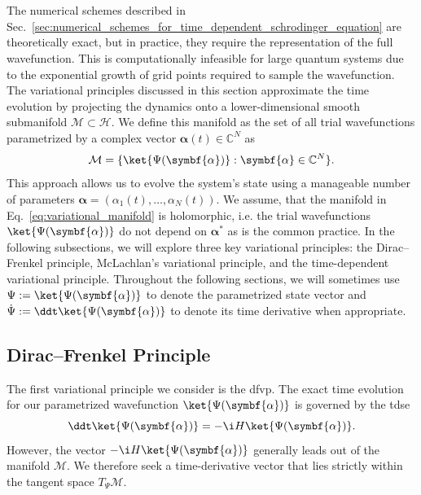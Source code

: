 \section{\filetotitle}\label{sec:variational_principles}
The numerical schemes described in Sec.~\ref{sec:numerical_schemes_for_time_dependent_schrodinger_equation} are theoretically exact, but in practice, they require the representation of the full wavefunction. This is computationally infeasible for large quantum systems due to the exponential growth of grid points required to sample the wavefunction. The variational principles discussed in this section approximate the time evolution by projecting the dynamics onto a lower-dimensional smooth submanifold $\mathcal{M}\subset\mathcal{H}$. We define this manifold as the set of all trial wavefunctions parametrized by a complex vector $\symbf{\alpha}(t)\in\mathbb{C}^N$ as
\begin{equation}\label{eq:variational_manifold}
\mathcal{M}=\lbrace\ket{\Psi(\symbf{\alpha})}:\symbf{\alpha}\in\mathbb{C}^N\rbrace.
\end{equation}
This approach allows us to evolve the system's state using a manageable number of parameters $\symbf{\alpha}=(\alpha_1(t),\ldots,\alpha_N(t))$. We assume, that the manifold in Eq.~\eqref{eq:variational_manifold} is holomorphic, i.e. the trial wavefunctions $\ket{\Psi(\symbf{\alpha})}$ do not depend on $\symbf{\alpha}^\ast$ as is the common practice. In the following subsections, we will explore three key variational principles: the Dirac--Frenkel principle, McLachlan's variational principle, and the time-dependent variational principle. Throughout the following sections, we will sometimes use $\Psi:=\ket{\Psi(\symbf{\alpha})}$ to denote the parametrized state vector and $\dot\Psi:=\ddt\ket{\Psi(\symbf{\alpha})}$ to denote its time derivative when appropriate.
\subsection{Dirac--Frenkel Principle}\label{sec:dirac_frenkel_principle}
The first variational principle we consider is the \acrfull{dfvp}.\supercite{10.1017/S0305004100016108,1477741} The exact time evolution for our parametrized wavefunction $\ket{\Psi(\symbf{\alpha})}$ is governed by the \acrshort{tdse}
\begin{equation}
\ddt\ket{\Psi(\symbf{\alpha})}=-\i H\ket{\Psi(\symbf{\alpha})}.
\end{equation}
However, the vector $-\i H\ket{\Psi(\symbf{\alpha})}$ generally leads out of the manifold $\mathcal{M}$. We therefore seek a time-derivative vector that lies strictly within the tangent space $T_{\Psi}\mathcal{M}$.

